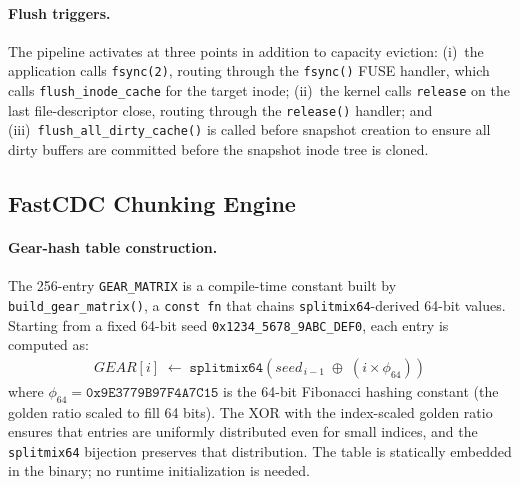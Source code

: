 \documentclass[5p,times]{elsarticle}
\begin{document}
\paragraph{Flush triggers.}
The pipeline activates at three points in addition to capacity eviction:
(i)~the application calls \texttt{fsync(2)}, routing through the
\texttt{fsync()} FUSE handler, which calls \texttt{flush\_inode\_cache}
for the target inode; (ii)~the kernel calls \texttt{release} on the
last file-descriptor close, routing through the \texttt{release()} handler;
and (iii)~\texttt{flush\_all\_dirty\_cache()} is called before snapshot
creation to ensure all dirty buffers are committed before the snapshot
inode tree is cloned.

\subsection{FastCDC Chunking Engine}
\label{sec:cdc}

\paragraph{Gear-hash table construction.}
The 256-entry \texttt{GEAR\_MATRIX} is a compile-time constant built by
\texttt{build\_gear\_matrix()}, a \texttt{const fn} that chains
\texttt{splitmix64}-derived 64-bit values.  Starting from a fixed 64-bit
seed \texttt{0x1234\_5678\_9ABC\_DEF0}, each entry is computed as:
\begin{align}
  \mathit{GEAR}[i] \;\leftarrow\;
    \texttt{splitmix64}\!\left(\mathit{seed}_{\,i-1}
      \;\oplus\;
      (i \times \phi_{64})\right)
  \label{eq:gear_matrix}
\end{align}
where $\phi_{64} = \texttt{0x9E3779B97F4A7C15}$ is the 64-bit
Fibonacci hashing constant (the golden ratio scaled to fill 64 bits).  The XOR with the
index-scaled golden ratio ensures that entries are uniformly distributed
even for small indices, and the \texttt{splitmix64} bijection preserves
that distribution.  The table is statically embedded in the binary;
no runtime initialization is needed.
\end{document}
